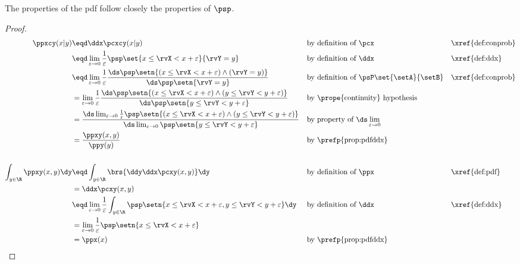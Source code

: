 The properties of the pdf follow closely the properties of  $\psp$.
\begin{theorem}
\end{theorem}
\begin{proof}
\begin{align*}
  \ppxcy(x|y)
    &\eqd \ddx\pcxcy(x|y)
    && \text{by definition of $\pcx$}
    && \text{\xref{def:conprob}}
  \\&\eqd \lim_{\varepsilon\to0} \frac{1}{\varepsilon} \psp\set{x\le\rvX < x+\varepsilon}{\rvY=y}
    && \text{by definition of $\ddx$}
    && \text{\xref{def:ddx}}
  \\&\eqd \lim_{\varepsilon\to0} 
          \frac{1}{\varepsilon} 
          \frac{\ds\psp\setn{(x\le\rvX < x+\varepsilon) \land (\rvY=y)}}
               {\ds\psp\setn{\rvY=y}}
    && \text{by definition of $\psP\set{\setA}{\setB}$}
    && \text{\xref{def:conprob}}
  \\&= \lim_{\varepsilon\to0} 
       \frac{1}{\varepsilon} 
       \frac{\ds\psp\setn{(x\le\rvX < x+\varepsilon) \land (y\le\rvY<y+\varepsilon)}}
            {\ds\psp\setn{y\le\rvY<y+\varepsilon}}
    && \text{by \prope{continuity} hypothesis}
  \\&=  \frac{\ds\lim_{\varepsilon\to0} \frac{1}{\varepsilon}\psp\setn{(x\le\rvX < x+\varepsilon) \land (y\le\rvY<y+\varepsilon)}}
             {\ds\lim_{\varepsilon\to0}                      \psp\setn{y\le\rvY<y+\varepsilon}}
    && \text{by property of $\ds\lim_{\varepsilon\to0}$}
  \\&=    \frac{\ppxy(x,y)}{\ppy(y)}
    && \text{by \prefp{prop:pdfddx}}
\\
\\
  \int_{y\in\R}\ppxy(x,y)\dy
    &\eqd \int_{y\in\R} \brs{ \ddy\ddx\pcxy(x,y) } \dy
    && \text{by definition of $\ppx$}
    && \text{\xref{def:pdf}}
  \\&= \ddx\pcxy(x,y) 
  \\&\eqd \lim_{\varepsilon\to0} \frac{1}{\varepsilon}
          \int_{y\in\R} \psp\setn{x\le\rvX<x+\varepsilon, y\le\rvY<y+\varepsilon} \dy
    && \text{by definition of $\ddx$}
    && \text{\xref{def:ddx}}
  \\&=    \lim_{\varepsilon\to0} \frac{1}{\varepsilon} \psp\setn{x\le\rvX<x+\varepsilon}
  \\&= \ppx(x)
    && \text{by \prefp{prop:pdfddx}}
\end{align*}
\end{proof}


